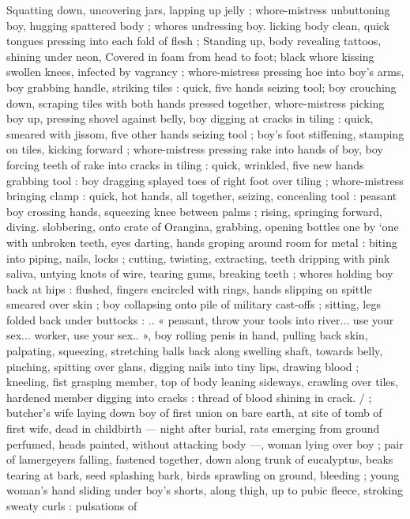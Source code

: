 Squatting down, uncovering jars, lapping up jelly ; whore-mistress
unbuttoning boy, hugging spattered body ; whores undressing boy.
licking body clean, quick tongues pressing into each fold of flesh ;
Standing up, body revealing tattoos, shining under neon,
Covered in foam from head to foot; black whore kissing swollen
knees, infected by vagrancy ; whore-mistress pressing hoe into boy's
arms, boy grabbing handle, striking tiles : quick, five hands seizing
tool; boy crouching down, scraping tiles with both hands pressed
together, whore-mistress picking boy up, pressing shovel against
belly, boy digging at cracks in tiling : quick, smeared with jissom, five
other hands seizing tool ; boy's foot stiffening, stamping on tiles,
kicking forward ; whore-mistress pressing rake into hands of boy,
boy forcing teeth of rake into cracks in tiling : quick, wrinkled, five
new hands grabbing tool : boy dragging splayed toes of right foot
over tiling ; whore-mistress bringing clamp : quick, hot hands, all
together, seizing, concealing tool : peasant boy crossing hands,
squeezing knee between palms ; rising, springing forward, diving.
slobbering, onto crate of Orangina, grabbing, opening bottles one by
‘one with unbroken teeth, eyes darting, hands groping around room
for metal : biting into piping, nails, locks ; cutting, twisting,
extracting, teeth dripping with pink saliva, untying knots of wire,
tearing gums, breaking teeth ; whores holding boy back at hips :
flushed, fingers encircled with rings, hands slipping on spittle
smeared over skin ; boy collapsing onto pile of military cast-offs ;
sitting, legs folded back under buttocks : .. « peasant, throw your
tools into river... use your sex... worker, use your sex.. », boy rolling
penis in hand, pulling back skin, palpating, squeezing, stretching
balls back along swelling shaft, towards belly, pinching, spitting over
glans, digging nails into tiny lips, drawing blood ; kneeling, fist
grasping member, top of body leaning sideways, crawling over tiles,
hardened member digging into cracks : thread of blood shining in
crack. / ; butcher's wife laying down boy of first union on bare earth,
at site of tomb of first wife, dead in childbirth --- night after burial,
rats emerging from ground perfumed, heads painted, without
attacking body ---, woman lying over boy ; pair of lamergeyers
falling, fastened together, down along trunk of eucalyptus, beaks
tearing at bark, seed splashing bark, birds sprawling on ground,
bleeding ; young woman's hand sliding under boy's shorts, along
thigh, up to pubic fleece, stroking sweaty curls : pulsations of
